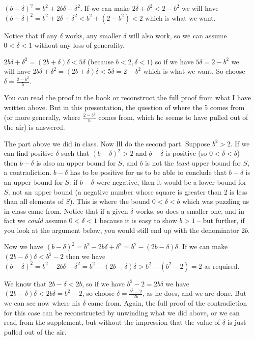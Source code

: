 \documentclass[12pt]{article}
\begin{document}
$(b+\delta)^2 = b^2+2b\delta + \delta^2$.  If we can make $2\delta + \delta^2<2-b^2$ we will have $(b+\delta)^2 = b^2+2\delta + \delta^2 < b^2+(2-b^2) <2$ which is what we want.

Notice that if any $\delta$ works, any smaller $\delta$ will also work, so we can assume $0<\delta<1$ without any loss of generality.

 $2b\delta+\delta^2 = (2b+\delta)\delta<5\delta$ (because $b<2, \delta<1$) so if we have $5\delta=2-b^2$ we will have $2b\delta+\delta^2 = (2b+\delta)\delta<5\delta=2-b^2$ which is what we want.  So choose $\delta = \frac{2-b^2}5$.

You can read the proof in the book or reconstruct the full proof from what I have written above.  But in this presentation, the question of where the 5 comes from (or more generally, where
$\frac{2-b^2}5$ comes from, which he seems to have pulled out of the air) is answered.

The part above we did in class.  Now Ill do the second part.  Suppose $b^2>2$.  If we can find positive $\delta$ such that $(b-\delta)^2>2$ and $b-\delta$ is positive (so $0<\delta<b$) then $b-\delta$ is also an upper bound for $S$,
and $b$ is not the {\em least\/} upper bound for $S$, a contradiction.  $b-\delta$ has to be positive for us to be able to conclude that $b-\delta$ is an upper bound for $S$:  if $b-\delta$ were negative, then it would be a lower bound for $S$, not an upper bound (a negative number whose square is greater than 2 is less than all elements of $S$).  This is where the bound
$0<\delta<b$ which was puzzling us in class came from.  Notice that if a given $\delta$ works, so does a smaller one, and in fact we {\em could\/} assume $0<\delta<1$ because it is easy to show
$b>1$ -- but further, if you look at the argument below, you would still end up with the denominator $2b$.

Now we have $(b-\delta)^2 = b^2 -2b\delta+\delta^2 = b^2 - (2b-\delta)\delta$.  If we can make $(2b-\delta)\delta < b^2-2$ then we have $(b-\delta)^2 = b^2 -2b\delta+\delta^2 = b^2 - (2b-\delta)\delta>b^2-(b^2-2)=2$ as required.  

We know that $2b-\delta<2b$, so if we have $b^2-2=2b\delta$ we have $(2b-\delta)\delta < 2b\delta = b^2-2$, so choose $\delta = \frac{b^2-2}{2b}$, as he does, and we are done.
But we can see now where his $\delta$ came from.  Again, the full proof of the contradiction for this case can be reconstructed by unwinding what we did above, or we can read from the supplement, but without the impression that the value of $\delta$ is just pulled out of the air.
\end{document}
